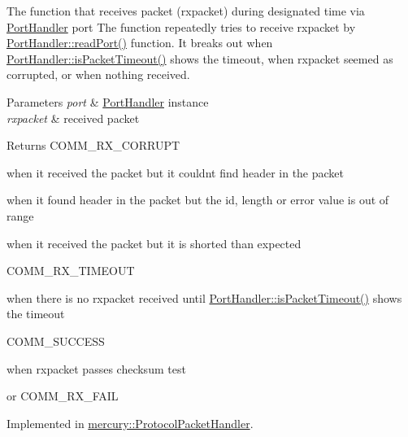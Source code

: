 The function that receives packet (rxpacket) during designated time via \hyperlink{classmercury_1_1_port_handler}{Port\+Handler} port  The function repeatedly tries to receive rxpacket by \hyperlink{classmercury_1_1_port_handler_afa6f52d7b95c5ffd8f0c92477d517c79}{Port\+Handler\+::read\+Port()} function.  It breaks out  when \hyperlink{classmercury_1_1_port_handler_a6733438255ede3d34738842e10cd8fc2}{Port\+Handler\+::is\+Packet\+Timeout()} shows the timeout,  when rxpacket seemed as corrupted, or  when nothing received. 


\begin{DoxyParams}{Parameters}
{\em port} & \hyperlink{classmercury_1_1_port_handler}{Port\+Handler} instance \\
\hline
{\em rxpacket} & received packet \\
\hline
\end{DoxyParams}
\begin{DoxyReturn}{Returns}
C\+O\+M\+M\+\_\+\+R\+X\+\_\+\+C\+O\+R\+R\+U\+PT 

when it received the packet but it couldn\textquotesingle{}t find header in the packet 

when it found header in the packet but the id, length or error value is out of range 

when it received the packet but it is shorted than expected 

C\+O\+M\+M\+\_\+\+R\+X\+\_\+\+T\+I\+M\+E\+O\+UT 

when there is no rxpacket received until \hyperlink{classmercury_1_1_port_handler_a6733438255ede3d34738842e10cd8fc2}{Port\+Handler\+::is\+Packet\+Timeout()} shows the timeout 

C\+O\+M\+M\+\_\+\+S\+U\+C\+C\+E\+SS 

when rxpacket passes checksum test 

or C\+O\+M\+M\+\_\+\+R\+X\+\_\+\+F\+A\+IL 
\end{DoxyReturn}


Implemented in \hyperlink{classmercury_1_1_protocol_packet_handler_a4d124ca43f6a2178497eaaabb9e5907b}{mercury\+::\+Protocol\+Packet\+Handler}.

